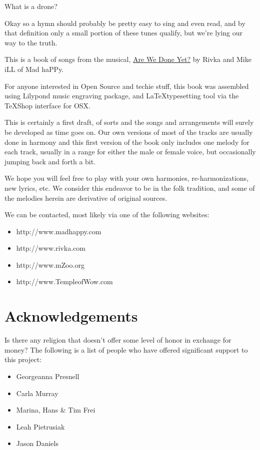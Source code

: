 \documentclass[a5paper,twoside,9pt]{extbook}
\begin{document}
What is a drone?

Okay so a hymn should probably be pretty easy to sing and even read, and by that definition only a small portion of these tunes qualify, but we're lying our way to the truth.

This is a book of songs from the musical, \underline{Are We Done Yet?} by Rivka and Mike iLL of Mad haPPy.

For anyone interested in Open Source and techie stuff, this book was assembled using Lilypond music engraving package, and \LaTeX  typesetting tool via the TeXShop interface for OSX.

This is certainly a first draft, of sorts and the songs and arrangements will surely be developed as time goes on. Our own versions of most of the tracks are usually done in harmony and this first version of the book only includes one melody for each track, usually in a range for either the male or female voice, but occasionally jumping back and forth a bit.

We hope you will feel free to play with your own harmonies, re-harmonizations, new lyrics, etc. We consider this endeavor to be in the folk tradition, and some of the melodies herein are derivative of original sources.

We can be contacted, most likely via one of the following websites: \\
\begin{itemize}
\item http://www.madhappy.com 
\item http://www.rivka.com
\item http://www.mZoo.org
\item http://www.TempleofWow.com
\end{itemize}
\pagebreak{}

\section{Acknowledgements}

Is there any religion that doesn't offer some level of honor in exchange for money?
\newline
The following is a list of people who have offered significant support to this project:
  
\begin{itemize}   
  \item Georgeanna Presnell
  \item Carla Murray
  \item Marina, Hans \& Tim Frei
  \item Leah Pietrusiak
  \item Jason Daniels
\end{itemize}    
\end{document}
